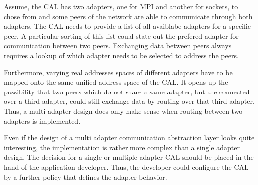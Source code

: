 


Assume, the CAL has two adapters, one for MPI and another for sockets,
to chose from and some peers of the network are able to communicate
through both adapters.  The CAL needs to provide a list of all
avaiblabe adapters for a specific peer. A particular sorting of this
list could state out the prefered adapter for communication between
two peers. Exchanging data between peers always requires a lookup of
which adapter needs to be selected to address the peers.





Furthermore, varying real addresses spaces of different adapters have
to be mapped onto the same unified address space of the CAL.  It opens
up the possibility that two peers which do not share a same adapter,
but are connected over a third adapter, could still exchange data by
routing over that third adapter. Thus, a multi adapter design does
only make sense when routing between two adapters is implemented.



Even if the design of a multi adapter communication abstraction layer
looks quite interesting, the implementation is rather more complex
than a single adapter design. The decision for a single or multiple
adapter CAL should be placed in the hand of the application developer.
Thus, the developer could configure the CAL by a further policy that
defines the adapter behavior.


